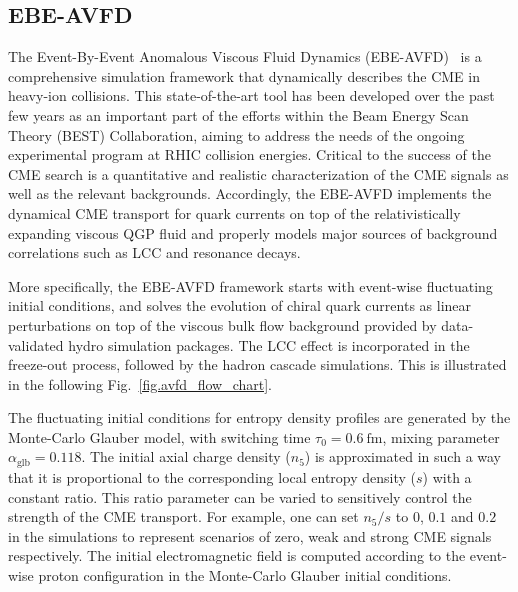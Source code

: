 \subsection{EBE-AVFD~\cite{Wang:2018ygc}}  

The Event-By-Event Anomalous Viscous Fluid Dynamics (EBE-AVFD)~\cite{Shi:2017cpu,Jiang:2016wve,Shi:2019wzi} is a comprehensive simulation framework that dynamically describes  the CME in heavy-ion collisions. This state-of-the-art tool has been developed over the past few years as an important part of the  efforts within the Beam Energy Scan Theory (BEST) Collaboration, aiming to address the needs of the ongoing experimental program at RHIC collision energies.   Critical to the success of the CME search is a quantitative and realistic characterization of the CME signals as well as the relevant backgrounds. Accordingly, the EBE-AVFD  implements the dynamical CME transport for quark currents on top of the relativistically expanding viscous QGP fluid and properly models   major sources of background correlations such as LCC and resonance decays.  

More specifically, the EBE-AVFD framework starts with event-wise fluctuating initial conditions, and solves the evolution of chiral quark currents as linear perturbations on top of the viscous bulk flow background provided by data-validated hydro simulation packages. The  LCC effect is incorporated in the freeze-out process, followed by the hadron cascade simulations. 
This is illustrated in the following Fig.~\ref{fig.avfd_flow_chart}.

\begin{figure}[htbp]
\vspace*{-0.01in}
 \label{fig:AVFD_delta}
\end{figure}


The fluctuating initial conditions for entropy density profiles are generated by the Monte-Carlo Glauber model, with switching time $\tau_0=0.6~\text{fm}$, mixing parameter $\alpha_\text{glb} = 0.118$. The initial axial charge density ($n_5$) is approximated in such a way that it is proportional to  the corresponding local entropy density ($s$) with a constant ratio. This ratio parameter can be varied to sensitively control the strength of the CME transport. For example, one can set  $n_5/s$ to $0$, $0.1$ and $0.2$  in the simulations to represent scenarios of zero, weak and strong CME signals respectively. The initial electromagnetic field is computed according to the event-wise proton configuration in the Monte-Carlo Glauber initial conditions.

